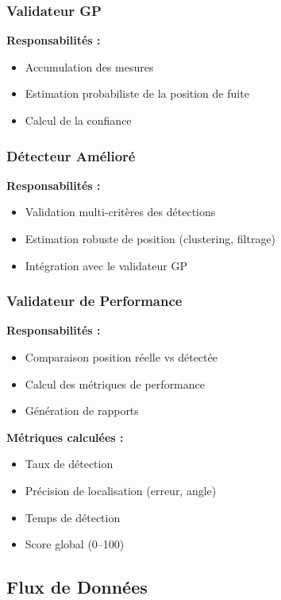 \documentclass[12pt,a4paper]{article}
\newcommand{\gp}{\textsc{GP}}
\begin{document}
\subsubsection{Validateur \gp{}}

\textbf{Responsabilités :}
\begin{itemize}
    \item Accumulation des mesures
    \item Estimation probabiliste de la position de fuite
    \item Calcul de la confiance
\end{itemize}

\subsubsection{Détecteur Amélioré}

\textbf{Responsabilités :}
\begin{itemize}
    \item Validation multi-critères des détections
    \item Estimation robuste de position (clustering, filtrage)
    \item Intégration avec le validateur \gp{}
\end{itemize}

\subsubsection{Validateur de Performance}

\textbf{Responsabilités :}
\begin{itemize}
    \item Comparaison position réelle vs détectée
    \item Calcul des métriques de performance
    \item Génération de rapports
\end{itemize}

\textbf{Métriques calculées :}
\begin{itemize}
    \item Taux de détection
    \item Précision de localisation (erreur, angle)
    \item Temps de détection
    \item Score global (0--100)
\end{itemize}

\subsection{Flux de Données}
\end{document}
